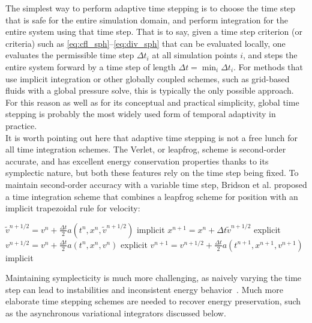 The simplest way to perform adaptive time stepping is to choose the time step that is safe for the entire simulation domain, and perform integration for the entire system using that time step.
That is to say, given a time step criterion (or criteria) such as \eqref{eq:cfl_sph}--\eqref{eq:div_sph} that can be evaluated locally, one evaluates the permissible time step $\Delta t_i$ at all simulation points $i$, and steps the entire system forward by a time step of length $\Delta t = \min_i \Delta t_i$.
For methods that use implicit integration or other globally coupled schemes, such as grid-based fluids with a global pressure solve, this is typically the only possible approach.
For this reason as well as for its conceptual and practical simplicity, global time stepping is probably the most widely used form of temporal adaptivity in practice.
\\
It is worth pointing out here that adaptive time stepping is not a free lunch for all time integration schemes.
The Verlet, or leapfrog, scheme is second-order accurate, and has excellent energy conservation properties thanks to its symplectic nature, but both these features rely on the time step being fixed.
To maintain second-order accuracy with a variable time step, Bridson et al. \cite{Bridson2003} proposed a time integration scheme that combines a leapfrog scheme for position with an implicit trapezoidal rule for velocity:
\smallskip
\begin{algorithmic}[1]
\State $\tilde v^{n+1/2} = v^n + \frac{\Delta t}2 a(t^n, x^n, \tilde v^{n+1/2})$ \Comment implicit
\State $x^{n+1} = x^n + \Delta t\tilde v^{n+1/2}$ \Comment explicit
\State $v^{n+1/2} = v^n + \frac{\Delta t}2 a(t^n, x^n, v^n)$ \Comment explicit
\State $v^{n+1} = v^{n+1/2} + \frac{\Delta t}2 a(t^{n+1}, x^{n+1}, v^{n+1})$ \Comment implicit
\end{algorithmic}
Maintaining symplecticity is much more challenging, as naively varying the time step can lead to instabilities and inconsistent energy behavior~\cite{Harmon2009}.
Much more elaborate time stepping schemes are needed to recover energy preservation, such as the asynchronous variational integrators discussed below.

